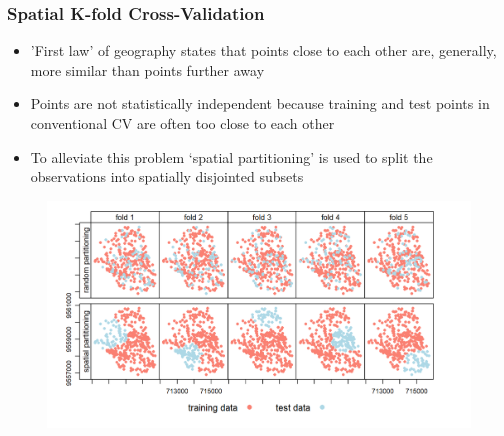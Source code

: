 \documentclass[
  shownotes,
  xcolor={svgnames},
  hyperref={colorlinks,citecolor=DarkBlue,linkcolor=DarkRed,urlcolor=DarkBlue}
  ]{beamer}
\begin{document}
\begin{frame}[fragile]
\frametitle{Spatial K-fold Cross-Validation }

\begin{itemize}
  \scriptsize
  \item 'First law' of geography states that points close to each other are, generally, more similar than points further away
  \item Points are not statistically independent because training and test points in conventional CV are often too close to each other 
  \item To alleviate this problem `spatial partitioning' is used to split the observations into spatially disjointed subsets 
\end{itemize}

 \begin{figure}[H] \centering
            \captionsetup{justification=centering}
              \includegraphics[scale=0.3]{figures/fig113.png}
       \end{figure}

\end{frame}
\end{document}
